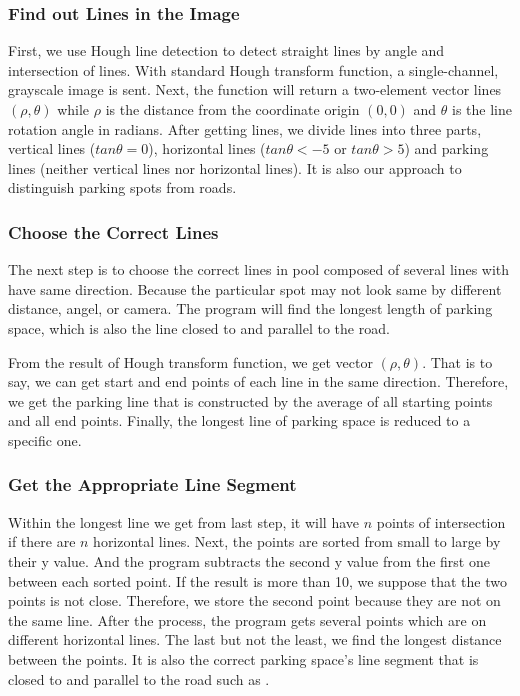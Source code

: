 \documentclass[preprint,12pt]{elsarticle}
\begin{document}
\subsubsection{Find out Lines in the Image}

First, we use Hough line detection to detect straight lines
by angle and intersection of lines.
With standard Hough transform function, a single-channel, grayscale image is sent.
Next, the function will return a two-element vector lines $(\rho, \theta)$ while $\rho$ is the distance
from the coordinate origin $(0, 0)$ and $\theta$ is the line rotation angle in radians.
After getting lines, we divide lines into three parts, vertical lines ($tan\theta = 0$),
horizontal lines ($tan\theta < -5$ or $tan\theta > 5$) and parking lines
(neither vertical lines nor horizontal lines). It is also our approach to
distinguish parking spots from roads.

\subsubsection{Choose the Correct Lines}

The next step is to choose the correct lines in pool composed of
several lines with have same direction. Because the particular spot
may not look same by different distance, angel, or camera.
The program will find the longest length of parking space, which is
also the line closed to and parallel to the road.

From the result of Hough transform function, we get vector $(\rho, \theta)$.
That is to say, we can get start and end points of each line in the same direction.
Therefore, we get the parking line that is constructed by the
average of all starting points and all end points.
Finally, the longest line of parking space is reduced to a specific one.

\subsubsection{Get the Appropriate Line Segment}

Within the longest line we get from last step, it will have $n$ points of
intersection if there are $n$ horizontal lines. Next, the points are
sorted from small to large by their y value. And the program subtracts
the second y value from the first one between each sorted point. If the
result is more than 10, we suppose that the two points is not close.
Therefore, we store the second point because they are not on the same line.
After the process, the program gets several points which are on
different horizontal lines. The last but not the least, we find the longest
distance between the points. It is also the correct parking space's line
segment that is closed to and parallel to the road such as .
\end{document}
